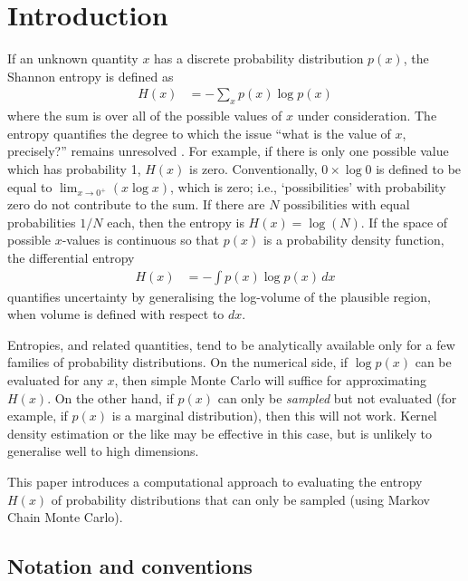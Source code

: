 \documentclass[entropy,article,accept,oneauthor,pdftex,10pt,a4paper]{mdpi}
\begin{document}

\section{Introduction}

If an unknown quantity $x$ has a discrete probability distribution $p(x)$,
the Shannon entropy \citep{shannon, cover2012elements} is defined as
\begin{align}
H(x) &= -\sum_{x} p(x) \log p(x)
\end{align}
where the sum is over all of the possible values of $x$ under consideration.
The entropy quantifies the degree to which the issue
``what is the value of $x$, precisely?'' remains unresolved
\citep{knuth_questions}. For example,
if there is only one possible value which has probability 1, $H(x)$ is
zero. Conventionally, $0 \times \log 0$ is defined to be equal
to $\lim_{x \to 0^+} (x\log x)$, which is zero; i.e., `possibilities' with
probability zero do not contribute to the sum.
If there are $N$ possibilities with equal probabilities $1/N$ each,
then the entropy is $H(x) = \log(N)$.
If the space of possible $x$-values is continuous so that $p(x)$ is a
probability density function, the differential entropy
\begin{align}
H(x) &= -\int p(x) \log p(x) \, dx
\end{align}
quantifies uncertainty by generalising the log-volume
of the plausible region, when volume is defined with respect to $dx$.

Entropies, and related quantities, tend to be analytically available only for
a few families of probability distributions. On the numerical side, if
$\log p(x)$ can be evaluated for any $x$, then simple Monte Carlo will suffice
for approximating $H(x)$. On the other hand, if $p(x)$ can only be
{\em sampled} but not evaluated (for example, if $p(x)$ is a marginal
distribution), then this will not work. Kernel density estimation or the like
\citep[e.g.][]{JMLR:v15:szabo14a}
may be effective in this case, but is unlikely to generalise well to high
dimensions.

This paper introduces a computational approach to evaluating the entropy 
$H(x)$ of probability distributions that can only be sampled
(using Markov Chain Monte Carlo).

\subsection{Notation and conventions}
\end{document}
